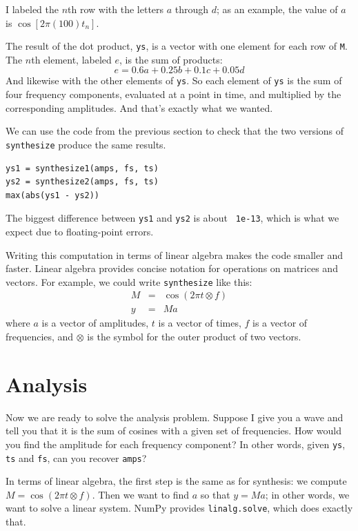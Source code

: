 \documentclass[12pt]{book}
\begin{document}
I labeled the $n$th row with the letters $a$ through $d$; as an
example, the value of $a$ is $\cos [2 \pi (100) t_n]$.

The result of the dot product, {\tt ys}, is a vector with one element
for each row of {\tt M}.  The $n$th element, labeled $e$, is the sum
of products:
%
\[ e = 0.6 a + 0.25 b + 0.1 c + 0.05 d \]
%
And likewise with the other elements of {\tt ys}.  So each element
of {\tt ys} is the sum of four frequency components, evaluated at
a point in time, and multiplied by the corresponding amplitudes.
And that's exactly what we wanted.

We can use the code from the previous section to check that the two
versions of {\tt synthesize} produce the same results.

\begin{verbatim}
ys1 = synthesize1(amps, fs, ts)
ys2 = synthesize2(amps, fs, ts)
max(abs(ys1 - ys2))
\end{verbatim}

The biggest difference between {\tt ys1} and {\tt ys2} is about {\tt
  1e-13}, which is what we expect due to floating-point errors.

Writing this computation in terms of linear algebra makes the code
smaller and faster.  Linear algebra
provides concise notation for operations on matrices and vectors.  For
example, we could write {\tt synthesize} like this:
%
\begin{eqnarray*}
M &=& \cos (2 \pi t \otimes f) \\
y &=& M a
\end{eqnarray*}
%
where $a$ is a vector of amplitudes,
$t$ is a vector of times, $f$ is a vector of frequencies, and
$\otimes$ is the symbol for the outer product of two vectors.


\section{Analysis}
\label{analysis}

Now we are ready to solve the analysis problem.  Suppose I give you
a wave and tell you that it is the sum of cosines with a given set
of frequencies.  How would you find the amplitude for each frequency
component?  In other words, given {\tt ys}, {\tt ts} and {\tt fs},
can you recover {\tt amps}?

In terms of linear algebra, the first step is the same as for
synthesis: we compute $M = \cos (2 \pi t \otimes f)$.  Then we want
to find $a$ so that $y = M a$; in other words, we want to solve a
linear system.  NumPy provides {\tt linalg.solve}, which does
exactly that.
\end{document}
